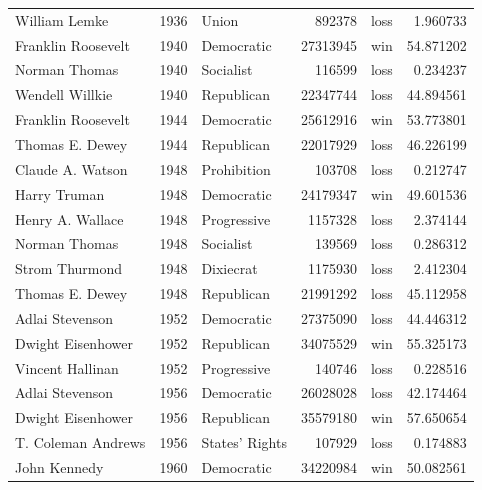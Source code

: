 \documentclass[
  letterpaper,
  DIV=11,
  numbers=noendperiod]{scrreprt}
\begin{document}
\begin{tabular}{lrlrlr}
William Lemke          &  1936 &                  Union &        892378 &   loss &   1.960733 \\
Franklin Roosevelt     &  1940 &             Democratic &      27313945 &    win &  54.871202 \\
Norman Thomas          &  1940 &              Socialist &        116599 &   loss &   0.234237 \\
Wendell Willkie        &  1940 &             Republican &      22347744 &   loss &  44.894561 \\
Franklin Roosevelt     &  1944 &             Democratic &      25612916 &    win &  53.773801 \\
Thomas E. Dewey        &  1944 &             Republican &      22017929 &   loss &  46.226199 \\
Claude A. Watson       &  1948 &            Prohibition &        103708 &   loss &   0.212747 \\
Harry Truman           &  1948 &             Democratic &      24179347 &    win &  49.601536 \\
Henry A. Wallace       &  1948 &            Progressive &       1157328 &   loss &   2.374144 \\
Norman Thomas          &  1948 &              Socialist &        139569 &   loss &   0.286312 \\
Strom Thurmond         &  1948 &              Dixiecrat &       1175930 &   loss &   2.412304 \\
Thomas E. Dewey        &  1948 &             Republican &      21991292 &   loss &  45.112958 \\
Adlai Stevenson        &  1952 &             Democratic &      27375090 &   loss &  44.446312 \\
Dwight Eisenhower      &  1952 &             Republican &      34075529 &    win &  55.325173 \\
Vincent Hallinan       &  1952 &            Progressive &        140746 &   loss &   0.228516 \\
Adlai Stevenson        &  1956 &             Democratic &      26028028 &   loss &  42.174464 \\
Dwight Eisenhower      &  1956 &             Republican &      35579180 &    win &  57.650654 \\
T. Coleman Andrews     &  1956 &         States' Rights &        107929 &   loss &   0.174883 \\
John Kennedy           &  1960 &             Democratic &      34220984 &    win &  50.082561 \\

\end{tabular}
\end{document}
